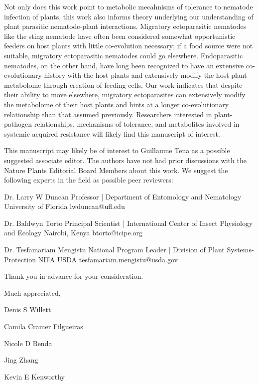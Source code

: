 \documentclass{article}
\begin{document}
Not only does this work point to metabolic mecahnisms of tolerance to nematode infection of plants, this work also informs theory underlying our understanding of plant parasitic nematode-plant interactions.  Migratory ectoparasitic nematodes like the sting nematode have often been considered somewhat opportunistic feeders on host plants with little co-evolution necessary; if a food source were not suitable, migratory ectoparasitic nematodes could go elsewhere.  Endoparasitic nematodes, on the other hand, have long been recognized to have an extensive co-evolutionary history with the host plants and extensively modify the host plant metabolome through creation of feeding cells.  Our work indicates that despite their ability to move elsewhere, migratory ectoparasites can extensively modify the metabolome of their host plants and hints at a longer co-evolutionary relationship than that assumed previously.  Researchers interested in plant-pathogen relationships, mechanisms of tolerance, and metabolites involved in systemic acquired resistance will likely find this manuscript of interest.  


This manuscript may likely be of interest to Guillaume Tena as a possible suggested associate editor. The authors have not had prior discussions with the Nature Plants Editorial Board Members about this work.  We suggest the following experts in the field as possible peer reviewers:


\setlength{\parindent}{0cm}
\begin{addmargin}[1in]{}

Dr. Larry W Duncan \newline
Professor | Department of Entomology and Nematology \newline
University of Florida \newline
lwduncan@ufl.edu \newline

Dr. Baldwyn Torto \newline
Principal Scientist | International Center of Insect Physiology and Ecology \newline
Nairobi, Kenya \newline
btorto@icipe.org \newline

Dr. Tesfamariam Mengistu \newline
National Program Leader | Division of Plant Systems-Protection \newline
NIFA USDA \newline
tesfamariam.mengistu@usda.gov \newline

\end{addmargin}

Thank you in advance for your consideration.  

\vspace{2em}

Much appreciated, \newline

\vspace{1em}

Denis S Willett
\vspace{0.48em}

Camila Cramer Filgueiras
\vspace{0.48em}

Nicole D Benda
\vspace{0.48em}

Jing Zhang
\vspace{0.48em} 

Kevin E Kenworthy
\end{document}
